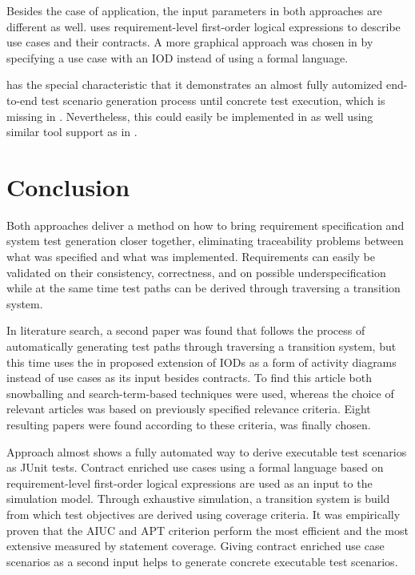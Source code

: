 Besides the case of application, the input parameters in both approaches are different as well. \cite{ClementineNebut2006} uses requirement-level first-order logical expressions to describe use cases and their contracts. A more graphical approach was chosen in \cite{NajlaRaza2007} by specifying a use case with an IOD instead of using a formal language. 

\cite{ClementineNebut2006} has the special characteristic that it demonstrates an almost fully automized end-to-end test scenario generation process until concrete test execution, which is missing in \cite{NajlaRaza2007}. Nevertheless, this could easily be implemented in \cite{NajlaRaza2007} as well using similar tool support as in \cite{ClementineNebut2006}. 

\section{Conclusion} \label{conclusion}

Both approaches deliver a method on how to bring requirement specification and system test generation closer together, eliminating traceability problems between what was specified and what was implemented. Requirements can easily be validated on their consistency, correctness, and on possible underspecification while at the same time test paths can be derived through traversing a transition system. 

In literature search, a second paper was found that follows the process of automatically generating test paths through traversing a transition system, but this time uses the in \cite{ClementineNebut2006} proposed extension of IODs as a form of activity diagrams instead of use cases as its input besides contracts. To find this article both snowballing and search-term-based techniques were used, whereas the choice of relevant articles was based on previously specified relevance criteria. Eight resulting papers were found according to these criteria, \cite{NajlaRaza2007} was finally chosen. 

Approach \cite{ClementineNebut2006} almost shows a fully automated way to derive executable test scenarios as JUnit tests. Contract enriched use cases using a formal language based on requirement-level first-order logical expressions are used as an input to the simulation model. Through exhaustive simulation, a transition system is build from which test objectives are derived using coverage criteria. It was empirically proven that the AIUC and APT criterion perform the most efficient and the most extensive measured by statement coverage. Giving contract enriched use case scenarios as a second input helps to generate concrete executable test scenarios. 


